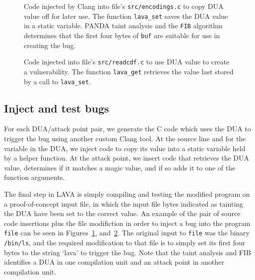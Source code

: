 \begin{figure}

\caption{Code injected by Clang into file's \texttt{src/encodings.c} to copy DUA value off for later use.
The function \texttt{lava\_set} saves the DUA value in a static variable.
PANDA taint analysis and the \texttt{FIB} algorithm determines that the first four bytes of \texttt{buf} are suitable for use in creating the bug.}
\label{src:dua-siphon}
\end{figure}

\begin{figure}

\caption{Code injected into file's \texttt{src/readcdf.c} to use DUA value to create a vulnerability.
The function \texttt{lava\_get} retrieves the value last stored by a call to  \texttt{lava\_set}.}
\label{src:dua-use}
\end{figure}

\subsection{Inject and test bugs}
For each DUA/attack point pair, we generate the C code which uses the DUA to trigger the bug using another custom Clang tool.
At the source line and for the variable in the DUA, we inject code to copy its value into a static variable held by a helper function.
At the attack point, we insert code that retrieves the DUA value, determines if it matches a magic value, and if so adds it to one of the function arguments.

The final step in LAVA is simply compiling and testing the modified program on a proof-of-concept input file, in which the input file bytes indicated as tainting the DUA have been set to the correct value.
An example of the pair of source code insertions plus the file modifiction in order to inject a bug into the program \verb+file+ can be seen in Figures~\ref{src:dua-siphon}, and~\ref{src:dua-use}.
The original input to \verb+file+ was the binary \verb+/bin/ls+, and the required modification to that file is to simply set its first four bytes to the string `lava' to trigger the bug. 
Note that the taint analysis and FIB identifies a DUA in one compilation unit and an attack point in another compilation unit.  

